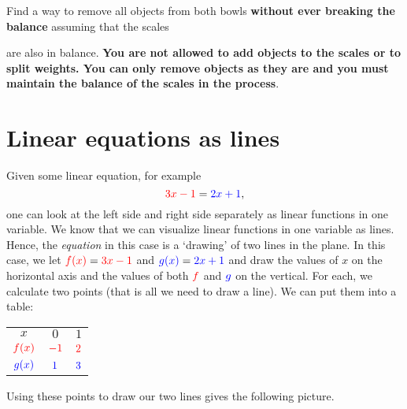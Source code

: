 \documentclass[a4paper,11pt]{article}
\newcommand{\tr}{\textcolor{red}}
\newcommand{\tb}{\textcolor{blue}}
\begin{document}
\begin{enumerate}[topsep=0pt,label=\arabic*.]
\begin{center}
 \end{center}
 Find a way to remove all objects from both bowls \textbf{without ever breaking
 the balance} assuming that the scales
 \begin{center}
 \end{center}
 are also in balance. \textbf{You are not allowed to add objects to the scales
 or to split weights. You can only remove objects as they are and you must
 maintain the balance of the scales in the process}.
\end{enumerate}

\section*{Linear equations as lines}

Given some linear equation, for example
\[
 \tr{3x - 1} = \tb{2x + 1},
\]
one can look at the left side and right side separately as linear functions in
one variable. We know that we can visualize linear functions in one variable as
lines. Hence, the \emph{equation} in this case is a `drawing' of two lines in
the plane. In this case, we let $\tr{f(x)} = \tr{3x - 1}$ and $\tb{g(x)} =
\tb{2x + 1}$ and draw the values of $x$ on the horizontal axis and the values of
both $\tr{f}$ and $\tb{g}$ on the vertical. For each, we calculate two points
(that is all we need to draw a line). We can put them into a table:
\begin{center}
 \begin{tabular}{c|cc}
  $x$ & $0$ & $1$\\
  \cmidrule{1-3}
  $\tr{f(x)}$ & $\tr{-1}$ & $\tr{2}$\\
  \cmidrule{1-3}
  $\tb{g(x)}$ & $\tb{1}$ & $\tb{3}$
 \end{tabular}
\end{center}

Using these points to draw our two lines gives the following picture.

\begin{center}
\end{center}
\end{document}
